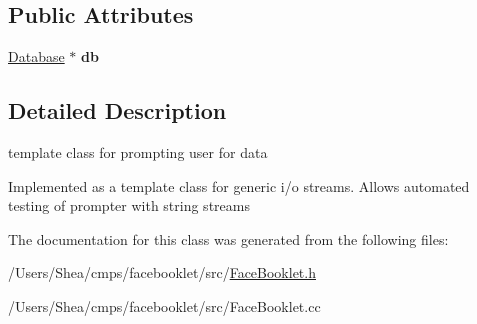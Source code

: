\subsection*{Public Attributes}
\begin{DoxyCompactItemize}
\item 
\hypertarget{classfb_1_1_prompter_ac89147193a8897786a08cf29ba6435d1}{\hyperlink{classfb_1_1_database}{Database} $\ast$ {\bfseries db}}\label{classfb_1_1_prompter_ac89147193a8897786a08cf29ba6435d1}

\end{DoxyCompactItemize}


\subsection{Detailed Description}
template class for prompting user for data 

Implemented as a template class for generic i/o streams. Allows automated testing of prompter with string streams 

The documentation for this class was generated from the following files\+:\begin{DoxyCompactItemize}
\item 
/\+Users/\+Shea/cmps/facebooklet/src/\hyperlink{_face_booklet_8h}{Face\+Booklet.\+h}\item 
/\+Users/\+Shea/cmps/facebooklet/src/Face\+Booklet.\+cc\end{DoxyCompactItemize}
